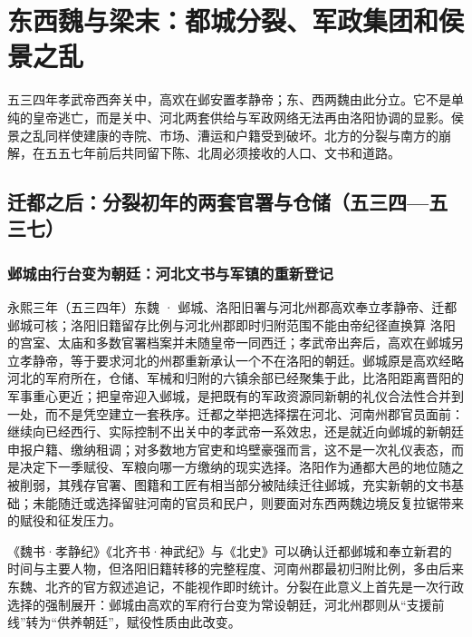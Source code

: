 \chapter{东西魏与梁末：都城分裂、军政集团和侯景之乱}
\label{ch:eastern-western-wei}




\begin{causalchain}[从北魏裂解到新朝门槛]
五三四年孝武帝西奔关中，高欢在邺安置孝静帝；东、西两魏由此分立。它不是单纯的皇帝逃亡，而是关中、河北两套供给与军政网络无法再由洛阳协调的显影。侯景之乱同样使建康的寺院、市场、漕运和户籍受到破坏。北方的分裂与南方的崩解，在五五七年前后共同留下陈、北周必须接收的人口、文书和道路。
\end{causalchain}

\section{迁都之后：分裂初年的两套官署与仓储（五三四—五三七）}

\subsection{邺城由行台变为朝廷：河北文书与军镇的重新登记}

\begin{event}{}{永熙三年（五三四年）}{东魏 · 邺城、洛阳旧署与河北州郡}{高欢奉立孝静帝、迁都邺城可核；洛阳旧籍留存比例与河北州郡即时归附范围不能由帝纪径直换算}
洛阳的宫室、太庙和多数官署档案并未随皇帝一同西迁；孝武帝出奔后，高欢在邺城另立孝静帝，等于要求河北的州郡重新承认一个不在洛阳的朝廷。邺城原是高欢经略河北的军府所在，仓储、军械和归附的六镇余部已经聚集于此，比洛阳距离晋阳的军事重心更近；把皇帝迎入邺城，是把既有的军政资源同新朝的礼仪合法性合并到一处，而不是凭空建立一套秩序。迁都之举把选择摆在河北、河南州郡官员面前：继续向已经西行、实际控制不出关中的孝武帝一系效忠，还是就近向邺城的新朝廷申报户籍、缴纳租调；对多数地方官吏和坞壁豪强而言，这不是一次礼仪表态，而是决定下一季赋役、军粮向哪一方缴纳的现实选择。洛阳作为通都大邑的地位随之被削弱，其残存官署、图籍和工匠有相当部分被陆续迁往邺城，充实新朝的文书基础；未能随迁或选择留驻河南的官员和民户，则要面对东西两魏边境反复拉锯带来的赋役和征发压力。

《魏书·孝静纪》《北齐书·神武纪》与《北史》可以确认迁都邺城和奉立新君的时间与主要人物，但洛阳旧籍转移的完整程度、河南州郡最初归附比例，多由后来东魏、北齐的官方叙述追记，不能视作即时统计。分裂在此意义上首先是一次行政选择的强制展开：邺城由高欢的军府行台变为常设朝廷，河北州郡则从“支援前线”转为“供养朝廷”，赋役性质由此改变。
\end{event}


